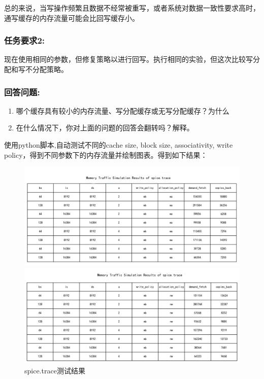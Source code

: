 \documentclass[12pt,hyperref,a4paper,UTF8]{ctexart}
\begin{document}
总的来说，当写操作频繁且数据不经常被重写，或者系统对数据一致性要求高时，通写缓存的内存流量可能会比回写缓存小。




\subsubsection*{任务要求2:}
现在使用相同的参数，但修复策略以进行回写。执行相同的实验，但这次比较写分配和写不分配策略。
\subsubsection*{回答问题:}
\begin{enumerate}
    \item 哪个缓存具有较小的内存流量、写分配缓存或无写分配缓存？为什么
    \item 在什么情况下，你对上面的问题的回答会翻转吗？解释。
\end{enumerate}

使用python脚本,自动测试不同的cache size, block size, associativity, write policy，得到不同参数下的内存流量并绘制图表。得到如下结果：



\begin{figure}[H]
    \centering
    \begin{minipage}[b]{0.45\textwidth}
        \centering
        \includegraphics[width=\textwidth]{./figures/fig/image39.png}
    \end{minipage}
    \hfill
    \begin{minipage}[b]{0.45\textwidth}
        \centering
        \includegraphics[width=\textwidth]{./figures/fig/image40.png}
    \end{minipage}
    \caption{spice.trace测试结果}
\end{figure}
\end{document}
